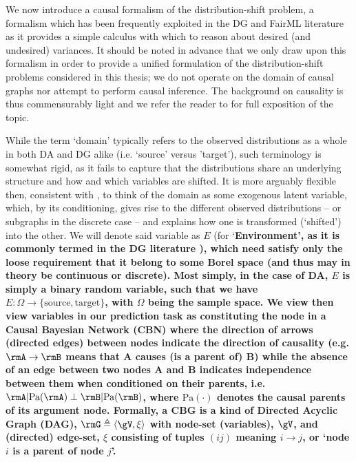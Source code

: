 We now introduce a causal formalism of the distribution-shift problem, a formalism which has been
frequently exploited in the DG and FairML literature as it provides a simple calculus with which
to reason about desired (and undesired) variances.
%
It should be noted in advance that we only draw upon this formalism in order to provide a unified
formulation of the distribution-shift problems considered in this thesis; we do not operate on the
domain of causal graphs nor attempt to perform causal inference. 
%
The background on causality is thus commensurably light and we refer the reader
to \cite{pearl2009causality} for full exposition of the topic.

While the term `domain' typically refers to the observed distributions as a whole in both DA and DG
alike (i.e. `source' versus 'target'), such terminology is somewhat rigid, as it fails to capture
that the distributions share an underlying structure and how and which variables are shifted.
%
It is more arguably flexible then, consistent with \citep{mooij2020joint}, to think of the domain
as some exogenous latent variable, which, by its conditioning, gives rise to the different observed
distributions -- or subgraphs in the discrete case -- and explains how one is transformed
(`shifted') into the other.
%
We will denote said variable as \(E\) (for `\bf{E}nvironment', as it is commonly termed in the DG
literature \citep{arjovskyinvariant}), which need satisfy only the loose requirement that it belong
to some Borel space (and thus may in theory be continuous or discrete).
%
Most simply, in the case of DA, \(E\) is simply a binary random variable, such that we have \(E:
\Omega \to \{ \text{source}, \text{target} \}\), with \( \Omega \) being the sample space.
%
We view then view variables in our prediction task as constituting the node \gV \) in a Causal
Bayesian Network (CBN) where the direction of arrows (directed edges) between nodes indicate the
direction of causality (e.g. \(\rmA \to \rmB \) means that \bf{A} causes (is a parent of) \bf{B})
while the absence of an edge between two nodes \textbf{A} and \textbf{B} indicates independence
between them when conditioned on their parents, i.e. \( \rmA | \text{Pa}(\rmA) \perp \rmB |
\text{Pa}(\rmB) \), where \( \text{Pa}(\cdot) \) denotes the causal parents of its argument node.
%
Formally, a CBG is a kind of Directed Acyclic Graph (DAG), \(\rmG \triangleq \langle \gV, \xi
\rangle \) with node-set (variables), \(\gV\), and (directed) edge-set, \(\xi\) consisting of tuples
\((ij)\) meaning \(i \to j \), or `node \(i\) is a parent of node \(j\)'.
